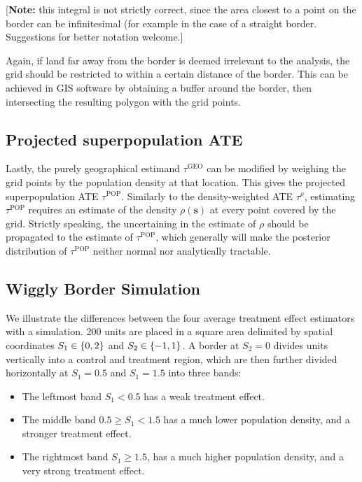 \documentclass[letter]{article}
\providecommand{\tightlist}{%
      \setlength{\itemsep}{0pt}\setlength{\parskip}{0pt}}
\newcommand{\svec}{\mathbold{s}}
\newcommand{\taurho}{\tau^{\rho}}
\newcommand{\taugeo}{\tau^{\mathrm{GEO}}}
\newcommand{\taupop}{\tau^{\mathrm{POP}}}
\providecommand{\tightlist}{%
  	  \setlength{\itemsep}{0pt}\setlength{\parskip}{0pt}}
\begin{document}
{[}\textbf{Note:} this integral is not strictly correct, since the area closest to a point on the border can be infinitesimal (for example in the case of a straight border. Suggestions for better notation welcome.{]}

Again, if land far away from the border is deemed irrelevant to the analysis, the grid should be restricted to within a certain distance of the border.
This can be achieved in GIS software by obtaining a buffer around the border, then intersecting the resulting polygon with the grid points.
    


    	\subsection{Projected superpopulation ATE}\label{projected-superpopulation-ate}

Lastly, the purely geographical estimand \(\taugeo\) can be modified by weighing the grid points by the population density at that location.
This gives the projected superpopulation ATE \(\taupop\).
Similarly to the density-weighted ATE \(\taurho\), estimating \(\taupop\) requires an estimate of the density \(\rho(\svec)\) at every point covered by the grid.
Strictly speaking, the uncertaining in the estimate of \(\rho\) should be propagated to the estimate of \(\taupop\), which generally will make the posterior distribution of \(\taupop\) neither normal nor analytically tractable.
    


    	\subsection{Wiggly Border Simulation}\label{wiggly-border-simulation}

We illustrate the differences between the four average treatment effect estimators with a simulation.
200 units are placed in a square area delimited by spatial coordinates \(S_1 \in \cbr{0,2}\) and \(S_2 \in \cbr{-1, 1}\).
A border at \(S_2=0\) divides units vertically into a control and treatment region,
which are then further divided horizontally at \(S_1=0.5\) and \(S_1=1.5\) into three bands:

\begin{itemize}
\tightlist
\item
  The leftmost band \(S_1 < 0.5\) has a weak treatment effect.
\item
  The middle band \(0.5 \ge S_1 < 1.5\) has a much lower population density, and a stronger treatment effect.
\item
  The rightmost band \(S_1 \ge 1.5\), has a much higher population density, and a very strong treatment effect.
\end{itemize}
\end{document}
